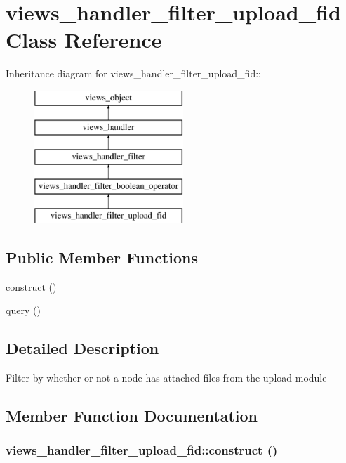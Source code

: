 \hypertarget{classviews__handler__filter__upload__fid}{
\section{views\_\-handler\_\-filter\_\-upload\_\-fid Class Reference}
\label{classviews__handler__filter__upload__fid}
}
Inheritance diagram for views\_\-handler\_\-filter\_\-upload\_\-fid::\begin{figure}[H]
\begin{center}
\leavevmode
\includegraphics[height=5cm]{classviews__handler__filter__upload__fid}
\end{center}
\end{figure}
\subsection*{Public Member Functions}
\begin{CompactItemize}
\item 
\hyperlink{classviews__handler__filter__upload__fid_a70c80a1b2c56da91501e496d7c29eb7}{construct} ()
\item 
\hyperlink{classviews__handler__filter__upload__fid_84a251fda29d367d7c915b736fe43b46}{query} ()
\end{CompactItemize}


\subsection{Detailed Description}
Filter by whether or not a node has attached files from the upload module 

\subsection{Member Function Documentation}
\hypertarget{classviews__handler__filter__upload__fid_a70c80a1b2c56da91501e496d7c29eb7}{
\subsubsection[{construct}]{\setlength{\rightskip}{0pt plus 5cm}views\_\-handler\_\-filter\_\-upload\_\-fid::construct ()}}
\label{classviews__handler__filter__upload__fid_a70c80a1b2c56da91501e496d7c29eb7}


